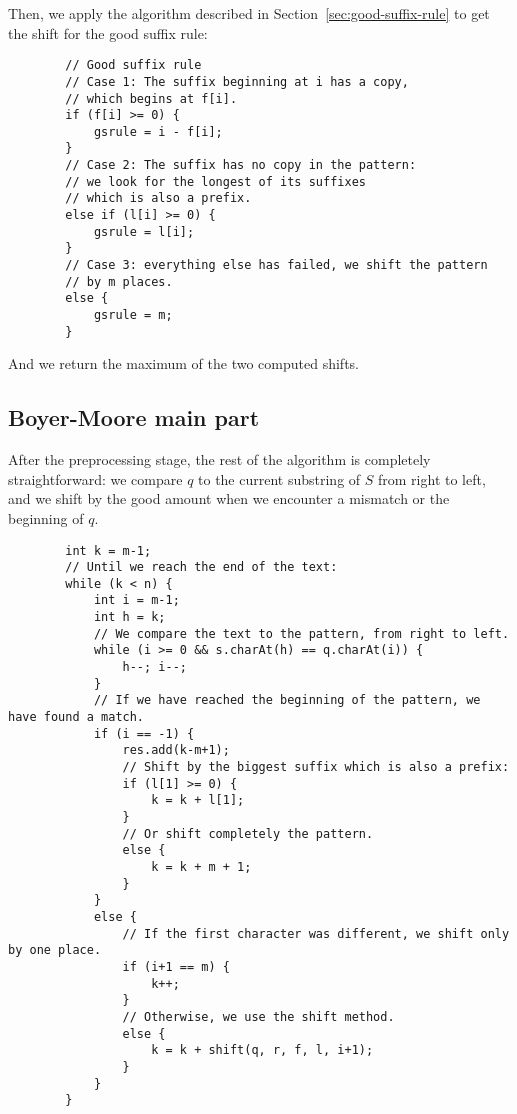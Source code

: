 \documentclass[a4paper,11pt,openany,extrafontsizes,twoside,article]{memoir}
\begin{document}
Then, we apply the algorithm described in
Section~\ref{sec:good-suffix-rule} to get the shift for the good
suffix rule:

\begin{verbatim}
        // Good suffix rule
        // Case 1: The suffix beginning at i has a copy,
        // which begins at f[i].
        if (f[i] >= 0) {
            gsrule = i - f[i];
        }
        // Case 2: The suffix has no copy in the pattern:
        // we look for the longest of its suffixes
        // which is also a prefix.
        else if (l[i] >= 0) {
            gsrule = l[i];
        }
        // Case 3: everything else has failed, we shift the pattern
        // by m places.
        else {
            gsrule = m;
        }
\end{verbatim}

And we return the maximum of the two computed shifts.

\subsection{Boyer-Moore main part}
\label{sec:boyer-moore-main}

After the preprocessing stage, the rest of the algorithm is completely
straightforward: we compare $q$ to the current substring of $S$ from
right to left, and we shift by the good amount when we encounter a
mismatch or the beginning of $q$.

\begin{verbatim}
        int k = m-1;
        // Until we reach the end of the text:
        while (k < n) {
            int i = m-1;
            int h = k;
            // We compare the text to the pattern, from right to left.
            while (i >= 0 && s.charAt(h) == q.charAt(i)) {
                h--; i--;
            }
            // If we have reached the beginning of the pattern, we have found a match.
            if (i == -1) {
                res.add(k-m+1);
                // Shift by the biggest suffix which is also a prefix:
                if (l[1] >= 0) {
                    k = k + l[1];
                }
                // Or shift completely the pattern.
                else {
                    k = k + m + 1;
                }
            }
            else {
                // If the first character was different, we shift only by one place.
                if (i+1 == m) {
                    k++;
                }
                // Otherwise, we use the shift method.
                else {
                    k = k + shift(q, r, f, l, i+1);
                }
            }
        }
\end{verbatim}
\end{document}
